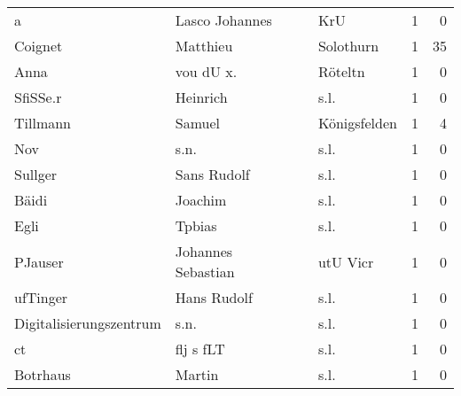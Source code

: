 \begin{tabular}{llllrr}
                        a &                     Lasco Johannes &             &                                         KrU &          1 &         0 \\
                  Coignet &                           Matthieu &             &                                   Solothurn &          1 &        35 \\
                     Anna &                          vou dU x. &             &                                     Röteltn &          1 &         0 \\
                 SfiSSe.r &                           Heinrich &             &                                        s.l. &          1 &         0 \\
                 Tillmann &                             Samuel &             &                                Königsfelden &          1 &         4 \\
                      Nov &                               s.n. &             &                                        s.l. &          1 &         0 \\
                  Sullger &                        Sans Rudolf &             &                                        s.l. &          1 &         0 \\
                    Bäidi &                            Joachim &             &                                        s.l. &          1 &         0 \\
                     Egli &                             Tpbias &             &                                        s.l. &          1 &         0 \\
                  PJauser &                 Johannes Sebastian &             &                                    utU Vicr &          1 &         0 \\
                 ufTinger &                        Hans Rudolf &             &                                        s.l. &          1 &         0 \\
  Digitalisierungszentrum &                               s.n. &             &                                        s.l. &          1 &         0 \\
                       ct &                          flj s fLT &             &                                        s.l. &          1 &         0 \\
                 Botrhaus &                             Martin &             &                                        s.l. &          1 &         0 \\

\end{tabular}
